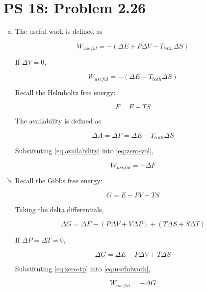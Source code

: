 \documentclass[12pt,a4paper]{article}
\begin{document}
\setcounter{page}{1}

\section*{PS 18: Problem 2.26}
\bigskip

\begin{enumerate}[(a)]

\item The useful work is defined as

\begin{equation}\label{eq:usefulwork}
	W_{useful} = -\left( \Delta E + P\Delta V - T_{bath} \Delta S \right)
\end{equation}

If $\Delta V = 0$,

\begin{equation}\label{eq:zero-vol}
	W_{useful} = -\left( \Delta E - T_{bath} \Delta S \right)
\end{equation}

Recall the Helmholtz free energy:

\begin{equation}\label{eq:helmholtz}
	F = E - TS
\end{equation}

The availability is defined as

\begin{equation}\label{eq:availability}
	\Delta A = \Delta F = \Delta E - T_{bath}\Delta S
\end{equation}

Substituting \eqref{eq:availability} into \eqref{eq:zero-vol},

\begin{equation}\label{eq:answer-a}
	\boxed{
		W_{useful} = -\Delta F
	}
\end{equation}

\item Recall the Gibbs free energy:

\begin{equation}\label{eq:gibbs}
	G = E - PV + TS
\end{equation}

Taking the delta differentials,

\begin{equation}
	\Delta G = \Delta E - \left( P\Delta V + V\Delta P \right) + \left( T\Delta S + S \Delta T \right)
\end{equation}

If $\Delta P = \Delta T = 0$,

\begin{equation}\label{eq:zero-tp}
	\Delta G = \Delta E - P\Delta V + T\Delta S
\end{equation}

Substituting \eqref{eq:zero-tp} into \eqref{eq:usefulwork},

\begin{equation}\label{answer-b}
	\boxed{
		W_{useful} = -\Delta G
	}
\end{equation}

\end{enumerate}
\end{document}
